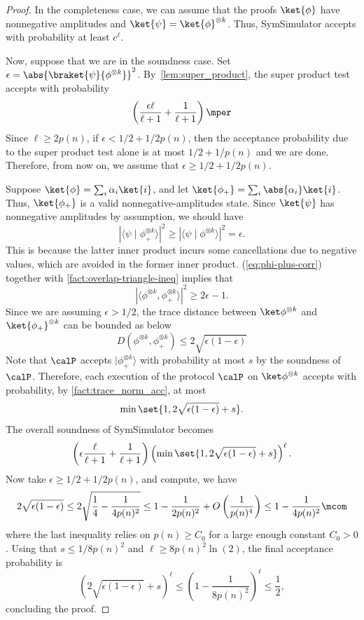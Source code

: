 \begin{proof}
  In the completeness case, we can assume that the proofs $\ket{\phi}$ have nonnegative amplitudes
  and $\ket{\psi} = \ket{\phi}^{\otimes k}$. Thus, SymSimulator accepts with probability at least $c^\ell$.

  Now, suppose that we are in the soundness case. Set $\epsilon =\abs{\braket{\psi}{\phi^{\otimes k}}}^2$.
  By~\cref{lem:super_product}, the super product test accepts with probability
    \[ 
  \left( \frac{ \epsilon\ell}{\ell+1} + \frac{1}{\ell+1} \right)\mper
    \] 
      Since $\ell \ge 2p(n)$, if $\epsilon < 1/2 + 1/2p(n)$, then the acceptance probability due to the super product test alone is at most $1/2+1/p(n)$
  and we are done. Therefore, from now on, we assume that $\epsilon \ge 1/2 + 1/2p(n)$. 
  
  Suppose $\ket{\phi} = \sum_i \alpha_i \ket{i}$, and let $\ket{\phi_+} = \sum_{i} \abs{\alpha_i} \ket{i}$. Thus, $\ket{\phi_+}$ is a valid nonnegative-amplitudes state.
  Since $\ket{\psi}$ has nonnegative amplitudes by assumption, we should have 
    \begin{equation}\label{eq:phi-plus-corr}
        |\langle \psi \mid \phi_+^{\otimes k} \rangle|^2 \ge |\langle \psi \mid \phi^{\otimes k} \rangle|^2 = \epsilon.
    \end{equation}
  This is because the latter inner product incurs some cancellations due to negative values, which are avoided in the former inner product. 
  (\ref{eq:phi-plus-corr}) together with \cref{fact:overlap-triangle-ineq} implies that  
    \begin{equation*}
        |\langle \phi^{\otimes k}, \phi_+^{\otimes k}\rangle|^2
            \ge 2\epsilon-1.
    \end{equation*}
  Since we are assuming $\epsilon > 1/2$, the trace distance between $\ket\phi ^{\otimes k}$ and $\ket{\phi_+}^{\otimes k}$ can be bounded as below
    \begin{equation}
        D(\phi^{\otimes k}, \phi_+^{\otimes k})\le 2\sqrt{\epsilon(1-\epsilon)}
    \end{equation}
  Note that $\calP$ accepts $|\phi_+^{\otimes k}\rangle$ with probability at most $s$ by the soundness of $\calP$.
  Therefore, each execution of the protocol $\calP$ on $\ket\phi ^{\otimes k}$ accepts with probability, by \cref{fact:trace_norm_acc}, at most 
  \[\min\set{1,2\sqrt{\epsilon(1-\epsilon)} + s}.\]
  The overall soundness of SymSimulator becomes
    \[ 
  \left(\epsilon \frac{\ell}{\ell+1} + \frac{1}{\ell+1} \right) \left( \min\set{1,2\sqrt{\epsilon(1-\epsilon)} + s} \right)^{\ell} .
    \] 
 Now take  $\epsilon \ge 1/2 + 1/2p(n)$, and compute, we have
    \[ 
  2\sqrt{\epsilon(1-\epsilon)} \le 2 \sqrt{\frac{1}{4} - \frac{1}{4 p(n)^2}} \le 1 - \frac{1}{2 p(n)^2} + O\left(\frac{1}{p(n)^4}\right) \le 1 - \frac{1}{4p(n)^2}\mcom
    \] 
  where the last inequality relies on $p(n) \ge C_0$ for a large enough constant $C_0 > 0$.
  Using that $s \le 1/8p(n)^2$ and $\ell  \ge 8 p(n)^2 \ln(2)$, the final acceptance probability is
    \[ 
  \left(2\sqrt{\epsilon(1-\epsilon)} + s \right)^{\ell} \le \left(1 - \frac{1}{8p(n)^2} \right)^\ell \le \frac{1}{2},
    \] 
  concluding the proof.
\end{proof}

